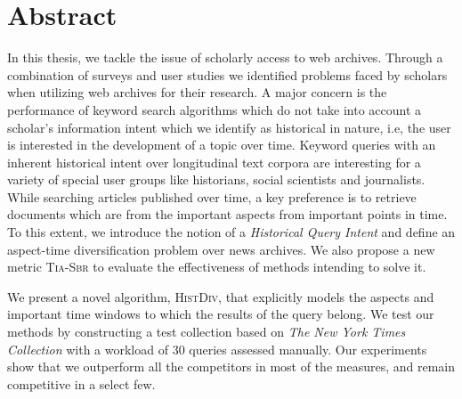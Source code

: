 \chapter{Abstract}
In this thesis, we tackle the issue of scholarly access to web archives. Through a combination of surveys and user studies we identified problems faced by scholars when utilizing web archives for their research. A major concern is the performance of keyword search algorithms which do not take into account a scholar's information intent which we identify as historical in nature, i.e, the user is interested in the development of a topic over time. Keyword queries with an inherent historical intent over longitudinal text corpora are interesting for a variety of special user groups like historians, social scientists and journalists. While searching articles published over time, a key preference is to retrieve documents which are from the important aspects from important points in time. To this extent, we introduce the notion of a \emph{Historical Query Intent} and define an aspect-time diversification problem over news archives. We also propose a new metric \textsc{Tia-Sbr} to evaluate the effectiveness of methods intending to solve it. 

\vspace{2mm}

We present a novel algorithm, \textsc{HistDiv}, that explicitly models the aspects and important time windows to which the results of the query belong. We test our methods by constructing a test collection based on \emph{The New York Times Collection} with a workload of 30 queries assessed manually. Our experiments show that we outperform all the competitors in most of the measures, and remain competitive in a select few.

